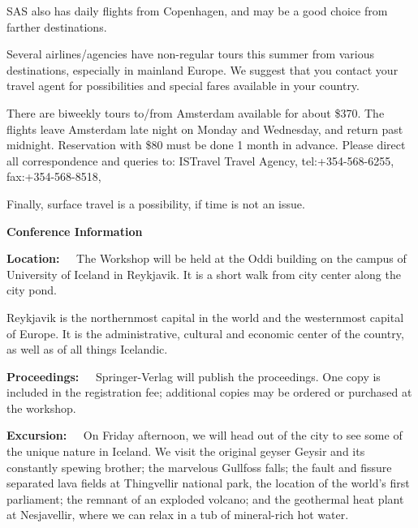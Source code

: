SAS also has daily flights from Copenhagen, and may be a good choice
from farther destinations.

Several airlines/agencies have non-regular tours this summer from
various destinations, especially in mainland Europe. We suggest that
you contact your travel agent for possibilities and special fares
available in your country.

There are biweekly tours to/from Amsterdam available for about \$370.
The flights leave Amsterdam late night on Monday and Wednesday, and
return past midnight. Reservation with \$80 must be done 1 month in
advance.  Please direct all correspondence and queries to: ISTravel
Travel Agency, tel:+354-568-6255, fax:+354-568-8518,

Finally, surface travel is a possibility, if time is not an issue.

\newpage
\parskip=4pt
\begin{center}

{\normalsize\bf Conference Information}

\end{center}

\vspace{.5cm}

{\bf Location:\ \ } 
The Workshop will be held at the Oddi building on
the campus of University of Iceland in Reykjavik. It is a short walk from city
center along the city pond.

Reykjavik is the northernmost capital in the world and the westernmost
capital of Europe. It is the administrative, cultural and economic
center of the country, as well as of all things Icelandic.


{\bf Proceedings:\ \ }
Springer-Verlag will publish the proceedings.  
One copy is included in the registration fee;
additional copies may be ordered or purchased at the workshop.


{\bf Excursion:\ \ }
On Friday afternoon, we will head out of the city to see some of the
unique nature in Iceland. We visit the original geyser Geysir and its
constantly spewing brother; the marvelous Gullfoss falls; the fault
and fissure separated lava fields at Thingvellir national park, the
location of the world's first parliament; the remnant of an exploded
volcano; and the geothermal heat plant at Nesjavellir, where we
can relax in a tub of mineral-rich hot water.


